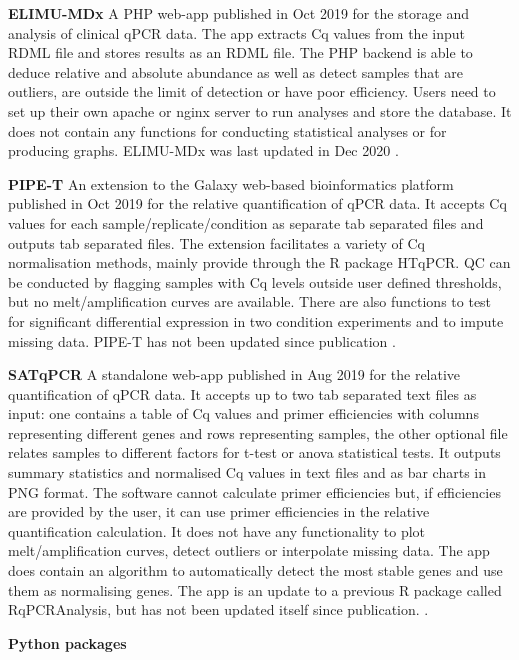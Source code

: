 \documentclass[../main.tex]{subfiles}
\begin{document}
\textbf{ELIMU-MDx} A PHP web-app published in Oct 2019 for the storage and analysis of clinical qPCR data. 
The app extracts Cq values from the input RDML file and stores results as an RDML file. 
The PHP backend is able to deduce relative and absolute abundance as well as detect samples that are outliers, are outside the limit of detection or have poor efficiency. 
Users need to set up their own apache or nginx server to run analyses and store the database. 
It does not contain any functions for conducting statistical analyses or for producing graphs. ELIMU-MDx was last updated in Dec 2020 \parencite{Krahenbuhl2019}.

\textbf{PIPE-T} An extension to the Galaxy web-based bioinformatics platform published in Oct 2019 for the relative quantification of qPCR data. 
It accepts Cq values for each sample/replicate/condition as separate tab separated files and outputs tab separated files. 
The extension facilitates a variety of Cq normalisation methods, mainly provide through the R package HTqPCR. 
QC can be conducted by flagging samples with Cq levels outside user defined thresholds, but no melt/amplification curves are available. 
There are also functions to test for significant differential expression in two condition experiments and to impute missing data. 
PIPE-T has not been updated since publication \parencite{Zanardi2019}.

\textbf{SATqPCR} A standalone web-app published in Aug 2019 for the relative quantification of qPCR data. 
It accepts up to two tab separated text files as input: one contains a table of Cq values and primer efficiencies with columns representing different genes and rows representing samples, the other optional file relates samples to different factors for t-test or anova statistical tests. 
It outputs summary statistics and normalised Cq values in text files and as bar charts in PNG format. 
The software cannot calculate primer efficiencies but, if efficiencies are provided by the user, it can use primer efficiencies in the relative quantification calculation. 
It does not have any functionality to plot melt/amplification curves, detect outliers or interpolate missing data. 
The app does contain an algorithm to automatically detect the most stable genes and use them as normalising genes. 
The app is an update to a previous R package called RqPCRAnalysis, but has not been updated itself since publication. \parencite{Rancurel2019}.


\textbf{Python packages}
\end{document}
